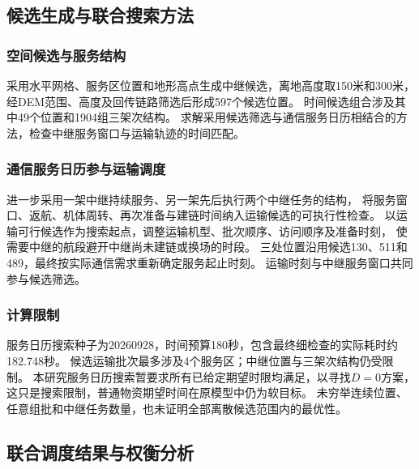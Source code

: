 \documentclass[bwprint]{gmcmthesis}
\begin{document}
\subsection{候选生成与联合搜索方法}
\subsubsection{空间候选与服务结构}
采用水平网格、服务区位置和地形高点生成中继候选，离地高度取150米和300米，
经DEM范围、高度及回传链路筛选后形成597个候选位置。
时间候选组合涉及其中49个位置和1904组三架次结构。
求解采用候选筛选与通信服务日历相结合的方法，检查中继服务窗口与运输轨迹的时间匹配。

\subsubsection{通信服务日历参与运输调度}
进一步采用一架中继持续服务、另一架先后执行两个中继任务的结构，
将服务窗口、返航、机体周转、再次准备与建链时间纳入运输候选的可执行性检查。
以运输可行候选作为搜索起点，调整运输机型、批次顺序、访问顺序及准备时刻，
使需要中继的航段避开中继尚未建链或换场的时段。
三处位置沿用候选130、511和489，最终按实际通信需求重新确定服务起止时刻。
运输时刻与中继服务窗口共同参与候选筛选。

\subsubsection{计算限制}
服务日历搜索种子为20260928，时间预算180秒，包含最终细检查的实际耗时约182.748秒。
候选运输批次最多涉及4个服务区；中继位置与三架次结构仍受限制。
本研究服务日历搜索暂要求所有已给定期望时限均满足，以寻找$D=0$方案，
这只是搜索限制，普通物资期望时间在原模型中仍为软目标。
未穷举连续位置、任意组批和中继任务数量，也未证明全部离散候选范围内的最优性。

\subsection{联合调度结果与权衡分析}
\end{document}
